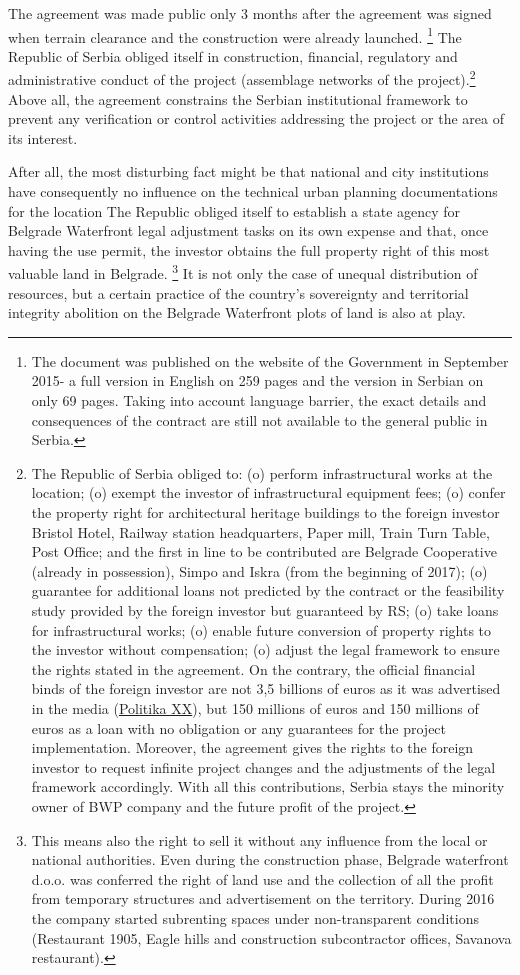 \documentclass[11pt]{report}
\begin{document}
The agreement was made public only 3 months after the agreement was signed when terrain clearance and the construction were already launched.
\footnote{The document was published on the website of the Government in September 2015- a full version in English on 259 pages and the version in Serbian on only 69 pages. Taking into account language barrier, the exact details and consequences of the contract are still not available to the general public in Serbia.}
The Republic of Serbia obliged itself in construction, financial, regulatory and administrative conduct of the project (assemblage networks of the project).\footnote{The Republic of Serbia obliged to: 
(o) perform infrastructural works at the location;
(o) exempt the investor of infrastructural equipment fees;
(o) confer the property right for architectural heritage buildings to the foreign investor {Bristol Hotel, Railway station headquarters, Paper mill, Train Turn Table, Post Office; and the first in line to be contributed are Belgrade Cooperative (already in possession), Simpo and Iskra (from the beginning of 2017)};
(o) guarantee for additional loans not predicted by the contract or the feasibility study provided by the foreign investor but guaranteed by RS;
(o) take loans for infrastructural works;
(o) enable future conversion of property rights to the investor without compensation;
(o) adjust the legal framework to ensure the rights stated in the agreement.
On the contrary, the official financial binds of the foreign investor are not 3,5 billions of euros as it was advertised in the media (\href{ref}{Politika XX}), but 150 millions of euros and 150 millions of euros as a loan with no obligation or any guarantees for the project implementation. Moreover, the agreement gives the rights to the foreign investor to request infinite project changes and the adjustments of the legal framework accordingly.
With all this contributions, Serbia stays the minority owner of BWP company and the future profit of the project.}
Above all, the agreement constrains the Serbian institutional framework to prevent any verification or control activities addressing the project or the area of its interest.

After all, the most disturbing fact might be that national and city institutions have consequently no influence on the technical urban planning documentations for the location
The Republic obliged itself to establish a state agency for Belgrade Waterfront legal adjustment tasks on its own expense and that, once having the use permit, the investor obtains the full  property right of this most valuable land in Belgrade.
\footnote{This means also the right to sell it without any influence from the local or national authorities. Even during the construction phase, Belgrade waterfront d.o.o. was conferred the right of land use and the collection of all the profit from temporary structures and advertisement on the territory. During 2016 the company started subrenting spaces under non-transparent conditions (Restaurant 1905, Eagle hills and construction subcontractor offices, Savanova restaurant).}
It is not only the case of unequal distribution of resources, but a certain practice of the country's sovereignty and territorial integrity abolition on the Belgrade Waterfront plots of land is also at play.
\end{document}
